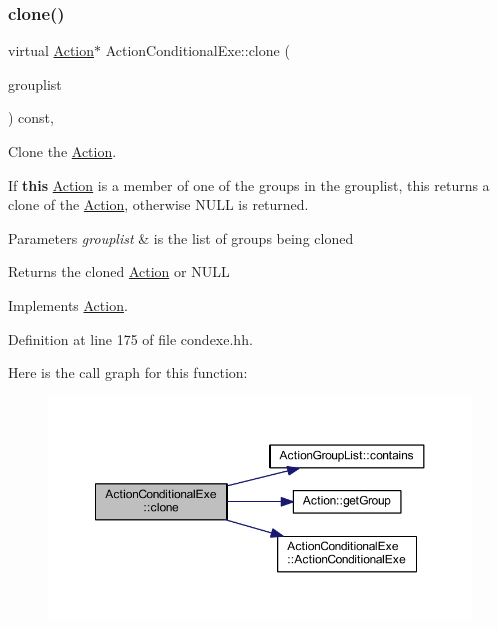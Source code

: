 \subsubsection{\texorpdfstring{clone()}{clone()}}
{\footnotesize\ttfamily virtual \mbox{\hyperlink{class_action}{Action}}$\ast$ Action\+Conditional\+Exe\+::clone (\begin{DoxyParamCaption}\item[{const \mbox{\hyperlink{class_action_group_list}{Action\+Group\+List}} \&}]{grouplist }\end{DoxyParamCaption}) const\hspace{0.3cm}{\ttfamily [inline]}, {\ttfamily [virtual]}}



Clone the \mbox{\hyperlink{class_action}{Action}}. 

If {\bfseries{this}} \mbox{\hyperlink{class_action}{Action}} is a member of one of the groups in the grouplist, this returns a clone of the \mbox{\hyperlink{class_action}{Action}}, otherwise N\+U\+LL is returned. 
\begin{DoxyParams}{Parameters}
{\em grouplist} & is the list of groups being cloned \\
\hline
\end{DoxyParams}
\begin{DoxyReturn}{Returns}
the cloned \mbox{\hyperlink{class_action}{Action}} or N\+U\+LL 
\end{DoxyReturn}


Implements \mbox{\hyperlink{class_action_af8242e41d09e5df52f97df9e65cc626f}{Action}}.



Definition at line 175 of file condexe.\+hh.

Here is the call graph for this function\+:
\nopagebreak
\begin{figure}[H]
\begin{center}
\leavevmode
\includegraphics[width=350pt]{class_action_conditional_exe_af0f575a8caa8a1dce2557f5abddec8e4_cgraph}
\end{center}
\end{figure}


